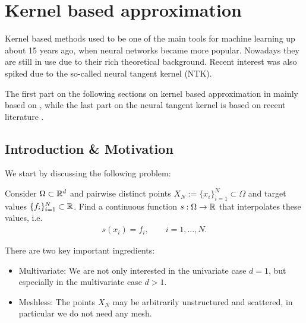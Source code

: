 \chapter{Kernel based approximation}


Kernel based methods used to be one of the main tools for machine learning up about 15 years ago, 
when neural networks became more popular.
Nowadays they are still in use due to their rich theoretical background. 
Recent interest was also spiked due to the so-called neural tangent kernel (NTK).

The first part on the following sections on kernel based approximation in mainly based on \cite{wendland2005scattered},
while the last part on the neural tangent kernel is based on recent literature \cite{jacot2018neural}.


\section{Introduction \& Motivation}

We start by discussing the following problem:

\begin{problem}
\label{prob:interpolation_problem}
Consider $\Omega \subset \mathbb{R}^d$ and pairwise distinct points $X_N := \{ x_i \}_{i=1}^N \subset \Omega$ and target values $\{ f_i \}_{i=1}^N \subset \mathbb{R}$.
Find a continuous function $s: \Omega \rightarrow \mathbb{R}$ that interpolates these values, i.e.\
\begin{align}
\label{eq:interpol_conditions}
s(x_i) = f_i, \qquad i=1, ..., N.
\end{align}
\end{problem}

There are two key important ingredients:
\begin{itemize}
\item Multivariate: We are not only interested in the univariate case $d=1$, but especially in the multivariate case $d>1$.
\item Meshless: The points $X_N$ may be arbitrarily unstructured and scattered, in particular we do not need any mesh.
\end{itemize}

